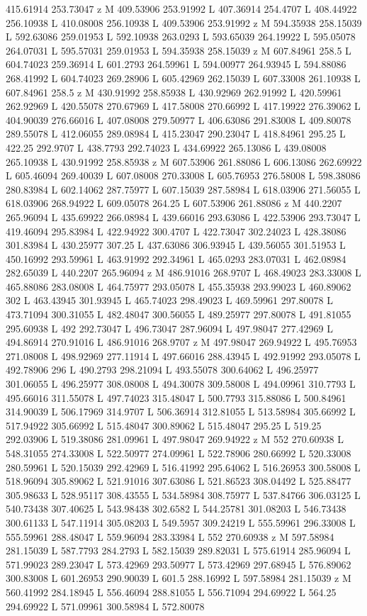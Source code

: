 {\begin{scope}[local bounding box=bb]
{415.61914 253.73047 z M 409.53906 253.91992 L 407.36914 254.4707 L 408.44922 256.10938 L 410.08008 256.10938 L 409.53906 253.91992 z M 594.35938 258.15039 L 592.63086 259.01953 L 592.10938 263.0293 L 593.65039 264.19922 L 595.05078 264.07031 L 595.57031 259.01953 L 594.35938 258.15039 z M 607.84961 258.5 L 604.74023 259.36914 L 601.2793 264.59961 L 594.00977 264.93945 L 594.88086 268.41992 L 604.74023 269.28906 L 605.42969 262.15039 L 607.33008 261.10938 L 607.84961 258.5 z M 430.91992 258.85938 L 430.92969 262.91992 L 420.59961 262.92969 L 420.55078 270.67969 L 417.58008 270.66992 L 417.19922 276.39062 L 404.90039 276.66016 L 407.08008 279.50977 L 406.63086 291.83008 L 409.80078 289.55078 L 412.06055 289.08984 L 415.23047 290.23047 L 418.84961 295.25 L 422.25 292.9707 L 438.7793 292.74023 L 434.69922 265.13086 L 439.08008 265.10938 L 430.91992 258.85938 z M 607.53906 261.88086 L 606.13086 262.69922 L 605.46094 269.40039 L 607.08008 270.33008 L 605.76953 276.58008 L 598.38086 280.83984 L 602.14062 287.75977 L 607.15039 287.58984 L 618.03906 271.56055 L 618.03906 268.94922 L 609.05078 264.25 L 607.53906 261.88086 z M 440.2207 265.96094 L 435.69922 266.08984 L 439.66016 293.63086 L 422.53906 293.73047 L 419.46094 295.83984 L 422.94922 300.4707 L 422.73047 302.24023 L 428.38086 301.83984 L 430.25977 307.25 L 437.63086 306.93945 L 439.56055 301.51953 L 450.16992 293.59961 L 463.91992 292.34961 L 465.0293 283.07031 L 462.08984 282.65039 L 440.2207 265.96094 z M 486.91016 268.9707 L 468.49023 283.33008 L 465.88086 283.08008 L 464.75977 293.05078 L 455.35938 293.99023 L 460.89062 302 L 463.43945 301.93945 L 465.74023 298.49023 L 469.59961 297.80078 L 473.71094 300.31055 L 482.48047 300.56055 L 489.25977 297.80078 L 491.81055 295.60938 L 492 292.73047 L 496.73047 287.96094 L 497.98047 277.42969 L 494.86914 270.91016 L 486.91016 268.9707 z M 497.98047 269.94922 L 495.76953 271.08008 L 498.92969 277.11914 L 497.66016 288.43945 L 492.91992 293.05078 L 492.78906 296 L 490.2793 298.21094 L 493.55078 300.64062 L 496.25977 301.06055 L 496.25977 308.08008 L 494.30078 309.58008 L 494.09961 310.7793 L 495.66016 311.55078 L 497.74023 315.48047 L 500.7793 315.88086 L 500.84961 314.90039 L 506.17969 314.9707 L 506.36914 312.81055 L 513.58984 305.66992 L 517.94922 305.66992 L 515.48047 300.89062 L 515.48047 295.25 L 519.25 292.03906 L 519.38086 281.09961 L 497.98047 269.94922 z M 552 270.60938 L 548.31055 274.33008 L 522.50977 274.09961 L 522.78906 280.66992 L 520.33008 280.59961 L 520.15039 292.42969 L 516.41992 295.64062 L 516.26953 300.58008 L 518.96094 305.89062 L 521.91016 307.63086 L 521.86523 308.04492 L 525.88477 305.98633 L 528.95117 308.43555 L 534.58984 308.75977 L 537.84766 306.03125 L 540.73438 307.40625 L 543.98438 302.6582 L 544.25781 301.08203 L 546.73438 300.61133 L 547.11914 305.08203 L 549.5957 309.24219 L 555.59961 296.33008 L 555.59961 288.48047 L 559.96094 283.33984 L 552 270.60938 z M 597.58984 281.15039 L 587.7793 284.2793 L 582.15039 289.82031 L 575.61914 285.96094 L 571.99023 289.23047 L 573.42969 293.50977 L 573.42969 297.68945 L 576.89062 300.83008 L 601.26953 290.90039 L 601.5 288.16992 L 597.58984 281.15039 z M 560.41992 284.18945 L 556.46094 288.81055 L 556.71094 294.69922 L 564.25 294.69922 L 571.09961 300.58984 L 572.80078 }
\end{scope}}
